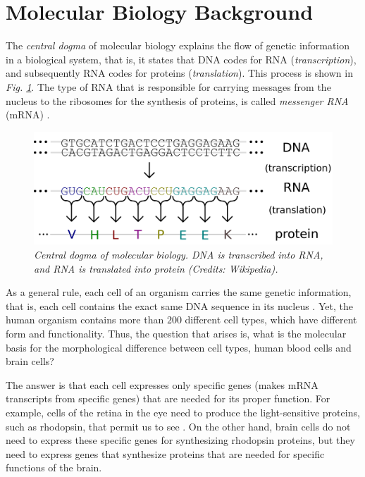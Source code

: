 \section{Molecular Biology Background} \label{molecular-back-sect}
The \emph{central dogma} of molecular biology explains the flow of genetic information in a biological system, that is, it states that DNA codes for RNA (\emph{transcription}), and subsequently RNA codes for proteins (\emph{translation}). This process is shown in \emph{Fig. \ref{central-dogma-pic}}. The type of RNA that is responsible for carrying messages from the nucleus to the ribosomes for the synthesis of proteins, is called \emph{messenger RNA} (mRNA) \citep{Jasny2001}. 
\vspace*{5mm}
\begin{figure}[!ht]
\begin{center}
 \includegraphics[scale = 0.39]{images/central-dogma3.png}
\caption{\emph{Central dogma of molecular biology. DNA is transcribed into RNA, and RNA is translated into protein (Credits: Wikipedia).}}
\label{central-dogma-pic}
\end{center}
\end{figure}

As a general rule, each cell of an organism carries the same genetic information, that is, each cell contains the exact same DNA sequence in its nucleus \citep{Jasny2001}. Yet, the human organism contains more than $200$ different cell types, which have different form and functionality. Thus, the question that arises is, what is the molecular basis for the morphological difference between cell types, \eg human blood cells and brain cells? 

The answer is that each cell expresses only specific genes (\ie makes mRNA transcripts from specific genes) that are needed for its proper function. For example, cells of the retina in the eye need to produce the light-sensitive proteins, such as rhodopsin, that permit us to see \citep{Jasny2001}. On the other hand, brain cells do not need to express these specific genes for synthesizing rhodopsin proteins, but they need to express genes that synthesize proteins that are needed for specific functions of the brain.

